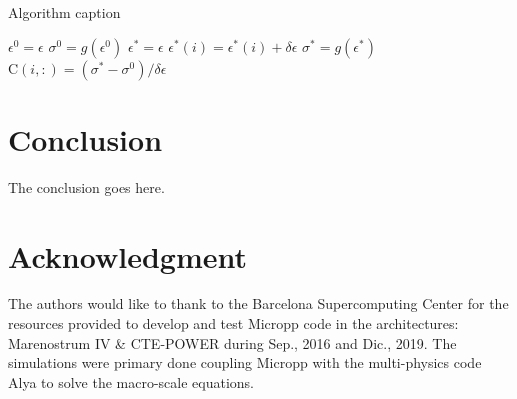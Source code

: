 \documentclass[conference, onecolumn]{IEEEtran}
\begin{document}
\begin{algorithm}
\caption{Algorithm caption}
\label{alg:algorithm-label}
\begin{algorithmic}
 \STATE $ \epsilon^{0} = \epsilon $
 \STATE $ \sigma^{0} = g(\epsilon^{0})$
     \STATE $ \epsilon^{*} = \epsilon $
     \STATE $ \epsilon^{*}(i) = \epsilon^{*}(i) + \delta\epsilon $
     \STATE $ \sigma^{*} = g(\epsilon^{*})$
     \STATE $ \mathrm{C} (i, :) = ( \sigma^* - \sigma^0 ) / \delta\epsilon $
 \ENDFOR
\end{algorithmic}
\end{algorithm}






\section{Conclusion}
The conclusion goes here.

\section*{Acknowledgment}

The authors would like to thank to the Barcelona Supercomputing Center for the resources provided to develop and test Micropp code in the architectures: Marenostrum IV \& CTE-POWER during Sep., 2016 and Dic., 2019. The simulations were primary done coupling Micropp with the multi-physics code Alya to solve the macro-scale equations.

\begin{thebibliography}{1}





\end{thebibliography}
\end{document}
